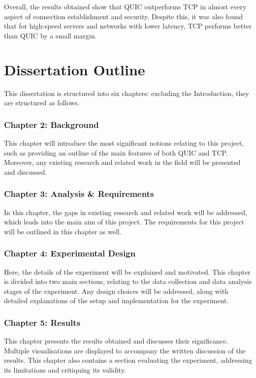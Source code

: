 \documentclass{l4proj}
\begin{document}
Overall, the results obtained show that QUIC outperforms TCP in almost every aspect of connection establishment and security. Despite this, it was also found that for high-speed servers and networks with lower latency, TCP performs better than QUIC by a small margin.


\section{Dissertation Outline}

This dissertation is structured into six chapters: excluding the Introduction, they are structured as follows.

\subsubsection{Chapter 2: Background} This chapter will introduce the most significant notions relating to this project, such as providing an outline of the main features of both QUIC and TCP. Moreover, any existing research and related work in the field will be presented and discussed. 

\subsubsection{Chapter 3: Analysis \& Requirements} In this chapter, the gaps in existing research and related work will be addressed, which leads into the main aim of this project. The requirements for this project will be outlined in this chapter as well.

\subsubsection{Chapter 4: Experimental Design} Here, the details of the experiment will be explained and motivated. This chapter is divided into two main sections, relating to the data collection and data analysis stages of the experiment. Any design choices will be addressed, along with detailed explanations of the setup and implementation for the experiment.

\subsubsection{Chapter 5: Results} This chapter presents the results obtained and discusses their significance. Multiple visualisations are displayed to accompany the written discussion of the results. This chapter also contains a section evaluating the experiment, addressing its limitations and critiquing its validity.
\end{document}
